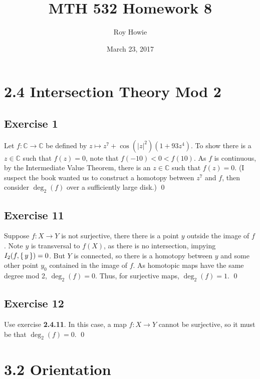 \documentclass{article}
\newcommand{\C}{\mathbb{C}}
\begin{document}
\title{\vspace{-2cm}MTH 532 Homework 8}
\author{Roy Howie}
\date{March 23, 2017}
\maketitle

\section*{2.4 Intersection Theory Mod 2}
  \subsection*{Exercise 1}
    Let $f\colon\C\to\C$ be defined by $z\mapsto z^7+\cos(|z|^2)(1+93z^4)$. To
    show there is a $z\in\C$ such that $f(z)=0$, note that $f(-10)<0<f(10)$. As
    $f$ is continuous, by the Intermediate Value Theorem, there is an $z\in\C$
    such that $f(z)=0$. (I suspect the book wanted us to construct a homotopy
    between $z^7$ and $f$, then consider $\deg_2(f)$ over a sufficiently large
    disk.)
    \qed

  \subsection*{Exercise 11}
    Suppose $f\colon X\to Y$ is not surjective, there there is a point $y$
    outside the image of $f$. Note $y$ is transversal to $f(X)$, as there is no
    intersection, impying $I_2(f, \set{y})=0$. But $Y$ is connected, so there is
    a homotopy between $y$ and some other point $y_0$ contained in the image of
    $f$. As homotopic maps have the same degree mod 2, $\deg_2(f)=0$. Thus, for
    surjective maps, $\deg_2(f)=1$.
    \qed

  \subsection*{Exercise 12}
    Use exercise \textbf{2.4.11}. In this case, a map $f\colon X\to Y$ cannot be
    surjective, so it must be that $\deg_2(f)=0$.
    \qed

\section*{3.2 Orientation}
\end{document}
